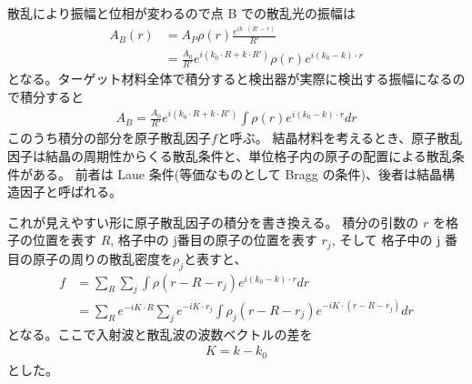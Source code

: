 \documentclass[11pt,dvipdfmx,a4paper]{jsarticle}
\begin{document}
散乱により振幅と位相が変わるので点 B での散乱光の振幅は
\begin{align}
	A_B(r) &= A_P \rho(r) \frac{e^{ik\cdot(R'-r)}}{R'}\\
	&=\frac{A_0}{R'}e^{i(k_0 \cdot R+ k \cdot R')}\rho(r)e^{i(k_0-k)\cdot r}
\end{align}
となる。ターゲット材料全体で積分すると検出器が実際に検出する振幅になるので積分すると
\begin{align}
	A_B =\frac{A_0}{R'}e^{i(k_0 \cdot R+ k \cdot R')}\int \rho(r) e^{i(k_0-k)\cdot r} dr
\end{align}
このうち積分の部分を原子散乱因子\(f\)と呼ぶ。
結晶材料を考えるとき、原子散乱因子は結晶の周期性からくる散乱条件と、単位格子内の原子の配置による散乱条件がある。
前者は Laue 条件(等価なものとして Bragg の条件)、後者は結晶構造因子と呼ばれる。

これが見えやすい形に原子散乱因子の積分を書き換える。
積分の引数の \(r\) を格子の位置を表す \(R\), 格子中の j番目の原子の位置を表す \(r_j\), そして
格子中の j 番目の原子の周りの散乱密度を\(\rho_j\)と表すと、
\begin{align}
	f&=\sum_R \sum_{j} \int\rho(r-R-r_j)e^{i(k_0-k)\cdot r} dr\\
	&=\sum_R e^{-iK\cdot R}\sum_j e^{-iK\cdot r_j} \int \rho_j(r-R-r_j) e^{-iK\cdot(r-R-r_j)}dr\label{factor_1}
\end{align}
となる。ここで入射波と散乱波の波数ベクトルの差を
\begin{align}
	K = k -k_0
\end{align}
とした。
\end{document}
